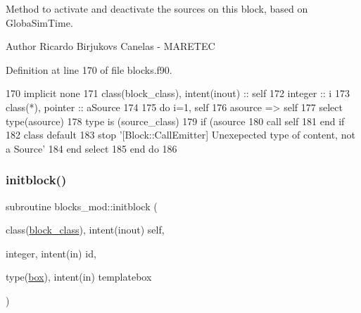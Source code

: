Method to activate and deactivate the sources on this block, based on GlobaSim\+Time. 

\begin{DoxyAuthor}{Author}
Ricardo Birjukovs Canelas -\/ M\+A\+R\+E\+T\+EC 
\end{DoxyAuthor}


Definition at line 170 of file blocks.\+f90.


\begin{DoxyCode}
170         \textcolor{keywordtype}{implicit none}
171         \textcolor{keywordtype}{class}(block\_class), \textcolor{keywordtype}{intent(inout)} :: self
172         \textcolor{keywordtype}{integer} :: i
173         \textcolor{keywordtype}{class}(*), \textcolor{keywordtype}{pointer} :: aSource
174 
175         \textcolor{keywordflow}{do} i=1, self%
176             asource => self%
177             \textcolor{keywordflow}{select type}(asource)
178 \textcolor{keywordflow}{            type is} (source\_class)
179                 \textcolor{keywordflow}{if} (asource%
180                     \textcolor{keyword}{call }self%
181 \textcolor{keywordflow}{                end if}
182 \textcolor{keywordflow}{            class default}
183             stop \textcolor{stringliteral}{'[Block::CallEmitter] Unexepected type of content, not a Source'}
184 \textcolor{keywordflow}{            end select}
185 \textcolor{keywordflow}{        end do}
186 
\end{DoxyCode}
\mbox{\label{namespaceblocks__mod_a534ca69b17b6f54ee07f995b02feff39}} 
\subsubsection{\texorpdfstring{initblock()}{initblock()}}
{\footnotesize\ttfamily subroutine blocks\+\_\+mod\+::initblock (\begin{DoxyParamCaption}\item[{class(\mbox{\hyperlink{structblocks__mod_1_1block__class}{block\+\_\+class}}), intent(inout)}]{self,  }\item[{integer, intent(in)}]{id,  }\item[{type(\mbox{\hyperlink{structgeometry__mod_1_1box}{box}}), intent(in)}]{templatebox }\end{DoxyParamCaption})\hspace{0.3cm}{\ttfamily [private]}}



